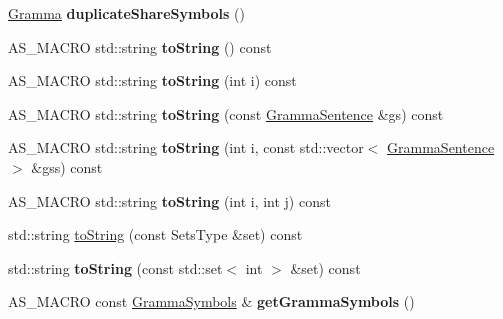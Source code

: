 \begin{DoxyCompactItemize}
\item 
\mbox{\label{classx2_1_1_gramma_a48f86b362ff1dc0d66b950032ff8de8a}} 
\hyperlink{classx2_1_1_gramma}{Gramma} {\bfseries duplicate\+Share\+Symbols} ()
\item 
\mbox{\label{classx2_1_1_gramma_aaf454e5652ec9d278950d0db09506798}} 
A\+S\+\_\+\+M\+A\+C\+RO std\+::string {\bfseries to\+String} () const
\item 
\mbox{\label{classx2_1_1_gramma_aabbb04e38d5027b21ae2ab03bfbfaa17}} 
A\+S\+\_\+\+M\+A\+C\+RO std\+::string {\bfseries to\+String} (int i) const
\item 
\mbox{\label{classx2_1_1_gramma_a8f79c3c8284ad9a7b2a080e0cc327137}} 
A\+S\+\_\+\+M\+A\+C\+RO std\+::string {\bfseries to\+String} (const \hyperlink{classx2_1_1_gramma_sentence}{Gramma\+Sentence} \&gs) const
\item 
\mbox{\label{classx2_1_1_gramma_a6853c16fd634bad1051ab8f8d212f3b8}} 
A\+S\+\_\+\+M\+A\+C\+RO std\+::string {\bfseries to\+String} (int i, const std\+::vector$<$ \hyperlink{classx2_1_1_gramma_sentence}{Gramma\+Sentence} $>$ \&gss) const
\item 
\mbox{\label{classx2_1_1_gramma_a0027de55c6f5cba74472f907aee33c61}} 
A\+S\+\_\+\+M\+A\+C\+RO std\+::string {\bfseries to\+String} (int i, int j) const
\item 
std\+::string \hyperlink{classx2_1_1_gramma_a04fc8a9d7e0dcc709706ac9bc117fb35}{to\+String} (const Sets\+Type \&set) const
\item 
\mbox{\label{classx2_1_1_gramma_ab88c409d2f637b743e224d5bf12bdc2c}} 
std\+::string {\bfseries to\+String} (const std\+::set$<$ int $>$ \&set) const
\item 
\mbox{\label{classx2_1_1_gramma_a52c38fc9e80328e3779f41df5717e33e}} 
A\+S\+\_\+\+M\+A\+C\+RO const \hyperlink{classx2_1_1_gramma_symbols}{Gramma\+Symbols} \& {\bfseries get\+Gramma\+Symbols} ()
\end{DoxyCompactItemize}

